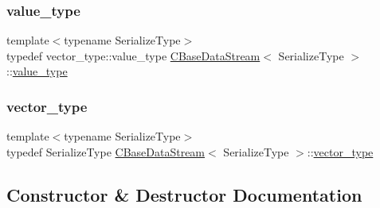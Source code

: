 \mbox{\label{class_c_base_data_stream_a92957c776eb4c9a7668dd9cd82f7dbdd}} 
\subsubsection{\texorpdfstring{value\+\_\+type}{value\_type}}
{\footnotesize\ttfamily template$<$typename Serialize\+Type$>$ \\
typedef vector\+\_\+type\+::value\+\_\+type \mbox{\hyperlink{class_c_base_data_stream}{C\+Base\+Data\+Stream}}$<$ Serialize\+Type $>$\+::\mbox{\hyperlink{class_c_base_data_stream_a92957c776eb4c9a7668dd9cd82f7dbdd}{value\+\_\+type}}}

\mbox{\label{class_c_base_data_stream_a035e97a3e024a8cfa4690eaca1e5e290}} 
\subsubsection{\texorpdfstring{vector\+\_\+type}{vector\_type}}
{\footnotesize\ttfamily template$<$typename Serialize\+Type$>$ \\
typedef Serialize\+Type \mbox{\hyperlink{class_c_base_data_stream}{C\+Base\+Data\+Stream}}$<$ Serialize\+Type $>$\+::\mbox{\hyperlink{class_c_base_data_stream_a035e97a3e024a8cfa4690eaca1e5e290}{vector\+\_\+type}}\hspace{0.3cm}{\ttfamily [protected]}}



\subsection{Constructor \& Destructor Documentation}
\mbox{\label{class_c_base_data_stream_a2713ae60ccb209e599777252209e770b}} 
